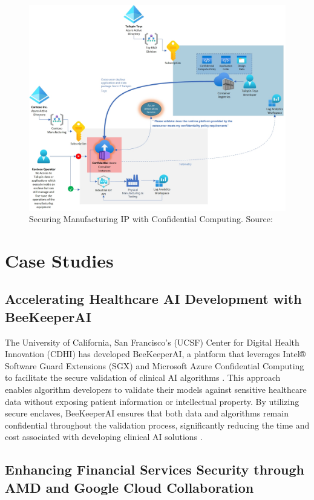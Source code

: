 \documentclass[conference]{IEEEtran}
\begin{document}
\begin{figure}[H]
\centerline{\includegraphics[width=\linewidth]{figures/manufacturing-ip-protection.jpg}}
\caption{Securing Manufacturing IP with Confidential Computing. Source: \cite{azure_mpc}}
\label{fig:manufacturing_ip_protection}
\end{figure}


\section{Case Studies}
\subsection{Accelerating Healthcare AI Development with BeeKeeperAI}

The University of California, San Francisco's (UCSF) Center for Digital Health Innovation (CDHI) 
has developed BeeKeeperAI, a platform that leverages Intel® Software Guard Extensions (SGX) and 
Microsoft Azure Confidential Computing to facilitate the secure validation of clinical AI 
algorithms \cite{fortanix}. This approach enables algorithm developers to validate their models against sensitive 
healthcare data without exposing patient information or intellectual property. By utilizing 
secure enclaves, BeeKeeperAI ensures that both data and algorithms remain confidential throughout 
the validation process, significantly reducing the time and cost associated with developing 
clinical AI solutions \cite{intel}.

\subsection{Enhancing Financial Services Security through AMD and Google Cloud Collaboration}
\end{document}
